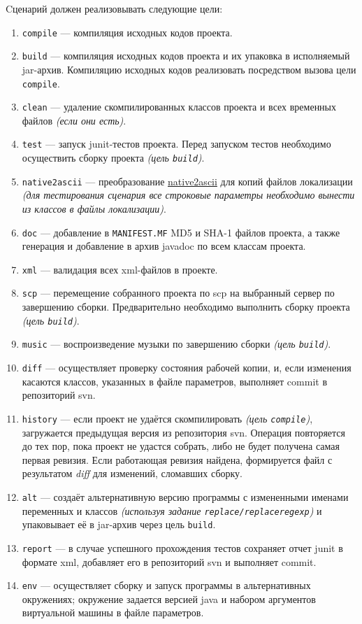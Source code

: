 Cценарий должен реализовывать следующие цели:
\begin{enumerate}
  \item \texttt{compile} --- компиляция исходных кодов проекта.
  \item \texttt{build} --- компиляция исходных кодов проекта и их упаковка в исполняемый jar-архив. Компиляцию исходных кодов реализовать посредством вызова цели \texttt{compile}.
  \item \texttt{clean} --- удаление скомпилированных классов проекта и всех временных файлов \textit{(если они есть)}.
  \item \texttt{test} --- запуск junit-тестов проекта. Перед запуском тестов необходимо осуществить сборку проекта \textit{(цель \texttt{build})}.
  \item \texttt{native2ascii} --- преобразование \href{https://docs.oracle.com/javase/8/docs/technotes/tools/windows/native2ascii.html}{native2ascii} для копий файлов локализации \textit{(для тестирования сценария все строковые параметры необходимо вынести из классов в файлы локализации)}.
  \item \texttt{doc} --- добавление в \texttt{MANIFEST.MF} MD5 и SHA-1 файлов проекта, а также генерация и добавление в архив javadoc по всем классам проекта.
  \item \texttt{xml} --- валидация всех xml-файлов в проекте.
  \item \texttt{scp} --- перемещение собранного проекта по scp на выбранный сервер по завершению сборки. Предварительно необходимо выполнить сборку проекта \textit{(цель \texttt{build})}.
  \item \texttt{music} --- воспроизведение музыки по завершению сборки \textit{(цель \texttt{build})}.
  \item \texttt{diff} --- осуществляет проверку состояния рабочей копии, и, если изменения касаются классов, указанных в файле параметров, выполняет commit в репозиторий svn.
  \item \texttt{history} --- если проект не удаётся скомпилировать \textit{(цель \texttt{compile})}, загружается предыдущая версия из репозитория svn. Операция повторяется до тех пор, пока проект не удастся собрать, либо не будет получена самая первая ревизия. Если работающая ревизия найдена, формируется файл с результатом \textit{diff} для изменений, сломавших сборку.
  \item \texttt{alt} --- создаёт альтернативную версию программы с измененными именами переменных и классов \textit{(используя задание \texttt{replace/replaceregexp})} и упаковывает её в jar-архив через цель \texttt{build}.
  \item \texttt{report} --- в случае успешного прохождения тестов сохраняет отчет junit в формате xml, добавляет его в репозиторий svn и выполняет commit.
  \item \texttt{env} --- осуществляет сборку и запуск программы в альтернативных окружениях; окружение задается версией java и набором аргументов виртуальной машины в файле параметров.
\end{enumerate}